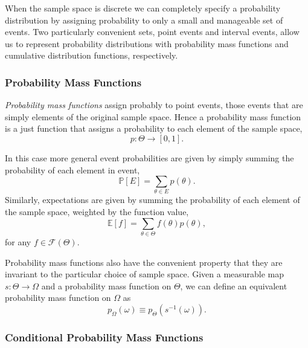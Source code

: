 \documentclass[11pt, oneside]{article}
\newcommand{\PP}{ \mathbb{P} }
\begin{document}
When the sample space is discrete we can completely specify a
probability distribution by assigning probability to only a small
and manageable set of events.  Two particularly convenient sets,
point events and interval events, allow us to represent probability
distributions with probability mass functions and cumulative 
distribution functions, respectively.  

\subsubsection{Probability Mass Functions}

\emph{Probability mass functions} assign probably to point events,
those events that are simply elements of the original sample space.  
Hence a probability mass function is a just function that assigns a 
probability to each element of the sample space,
%
\begin{equation*}
p : \Theta \rightarrow \left[0, 1\right].
\end{equation*}

In this case more general event probabilities are given by simply summing 
the probability of each element in event,
%
\begin{equation*}
\PP \! \left[ E \right]
=
\sum_{\theta \in E} p \! \left( \theta \right).
\end{equation*}
%
Similarly, expectations are given by summing the probability of each 
element of the sample space, weighted by the function value,
%
\begin{equation*}
\mathbb{E} \! \left[ f \right]
=
\sum_{\theta \in \Theta} f \! \left( \theta \right) p \! \left( \theta \right),
\end{equation*}
%
for any $f \in \mathcal{F} \! \left( \Theta \right)$.

Probability mass functions also have the convenient property that
they are invariant to the particular choice of sample space.  Given
a measurable map $s : \Theta \rightarrow \Omega$ and a probability 
mass function on $\Theta$, we can define an equivalent probability 
mass function on $\Omega$ as
%
\begin{equation*}
p_{\Omega} \! \left( \omega \right) 
\equiv 
p_{\Theta} \! \left( s^{-1} \! \left( \omega \right) \right).
\end{equation*}

\subsubsection{Conditional Probability Mass Functions}
\end{document}
